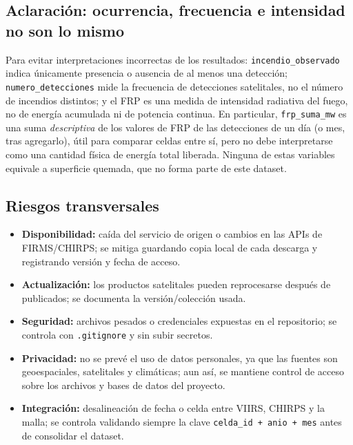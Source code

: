 \documentclass[11pt,a4paper]{article}
\begin{document}
\subsection*{Aclaraci\'on: ocurrencia, frecuencia e intensidad no son lo mismo}
Para evitar interpretaciones incorrectas de los resultados: \texttt{incendio\_observado} indica \'unicamente presencia o ausencia de al menos una detecci\'on; \texttt{numero\_detecciones} mide la frecuencia de detecciones satelitales, no el n\'umero de incendios distintos; y el FRP es una medida de intensidad radiativa del fuego, no de energ\'ia acumulada ni de potencia continua. En particular, \texttt{frp\_suma\_mw} es una suma \emph{descriptiva} de los valores de FRP de las detecciones de un d\'ia (o mes, tras agregarlo), \'util para comparar celdas entre s\'i, pero no debe interpretarse como una cantidad f\'isica de energ\'ia total liberada. Ninguna de estas variables equivale a superficie quemada, que no forma parte de este dataset.

\subsection*{Riesgos transversales}
\begin{itemize}
    \item \textbf{Disponibilidad:} ca\'ida del servicio de origen o cambios en las APIs de FIRMS/CHIRPS; se mitiga guardando copia local de cada descarga y registrando versi\'on y fecha de acceso.
    \item \textbf{Actualizaci\'on:} los productos satelitales pueden reprocesarse despu\'es de publicados; se documenta la versi\'on/colecci\'on usada.
    \item \textbf{Seguridad:} archivos pesados o credenciales expuestas en el repositorio; se controla con \texttt{.gitignore} y sin subir secretos.
    \item \textbf{Privacidad:} no se prev\'e el uso de datos personales, ya que las fuentes son geoespaciales, satelitales y clim\'aticas; aun as\'i, se mantiene control de acceso sobre los archivos y bases de datos del proyecto.
    \item \textbf{Integraci\'on:} desalineaci\'on de fecha o celda entre VIIRS, CHIRPS y la malla; se controla validando siempre la clave \texttt{celda\_id + anio + mes} antes de consolidar el dataset.
\end{itemize}

\end{document}
